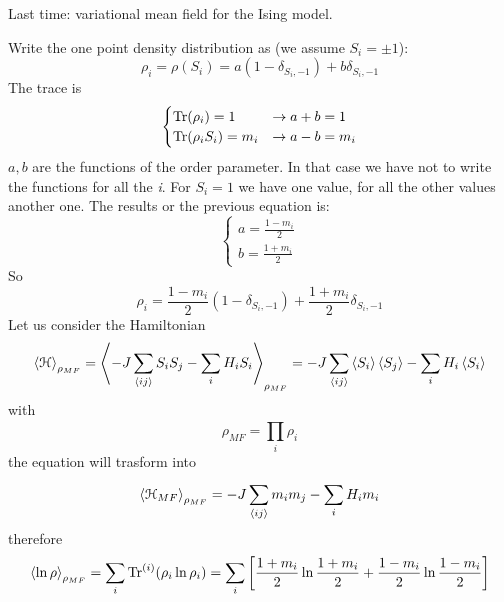 \documentclass[../main/main.tex]{subfiles}
\begin{document}

Last time: variational mean field for the Ising model.

Write the one point density distribution as (we assume \( S_i = \pm 1 \)):
\begin{equation}
  \rho _i = \rho (S_i) = a (1- \delta _{S_i,-1}) + b \delta _{S_i,-1}
\end{equation}
The trace is
\begin{equation}
  \begin{cases}
    \Tr(\rho _i) = 1  &\rightarrow  a+b=1\\
    \Tr(\rho _i S_i) = m_i  & \rightarrow a-b = m_i
  \end{cases}
\end{equation}
\( a,b \) are the functions of the order parameter.
In that case we have not to write the functions for all the \emph{i}. For \( S_i = 1 \) we have one value, for all the other values another one.
The results or the previous equation is:
\begin{equation}
  \begin{cases}
   a = \frac{1-m_i}{2} \\
   b = \frac{1+m_i}{2}
  \end{cases}
\end{equation}
So
\begin{equation}
  \rho _i =   \frac{1-m_i}{2}  (1- \delta _{S_i,-1}) + \frac{1+m_i}{2} \delta _{S_i,-1}
\end{equation}
Let us consider the Hamiltonian
\begin{equation}
  \expval{\mathcal{H}}_{\rho _{MF}} = \expval{-J \sum_{\expval{ij} }^{} S_i S_j - \sum_{i}^{} H_i S_i   }_{\rho _{MF}}
  = - J   \sum_{\expval{ij} }^{} \expval{S_i} \expval{S_j} - \sum_{i}^{} H_i \expval{S_i}
\end{equation}
with
\begin{equation}
  \rho _{MF} = \prod_{i}^{} \rho _i
\end{equation}
the equation will trasform into
\begin{equation}
  \expval{\mathcal{H}_{MF}}_{\rho _{MF}} = -J \sum_{\expval{ij} }^{} m_i m_j - \sum_{i}^{} H_i m_i
\end{equation}
therefore
\begin{equation}
  \expval{\ln{\rho } }_{\rho _{MF}} = \sum_{i}^{} \Tr^{(i)} (\rho _i \ln{\rho _i} )
  = \sum_{i}^{} \qty[ \frac{1+m_i}{2} \ln{\frac{1+m_i}{2}} + \frac{1-m_i}{2} \ln{\frac{1-m_i}{2}} ]
\end{equation}
\end{document}
